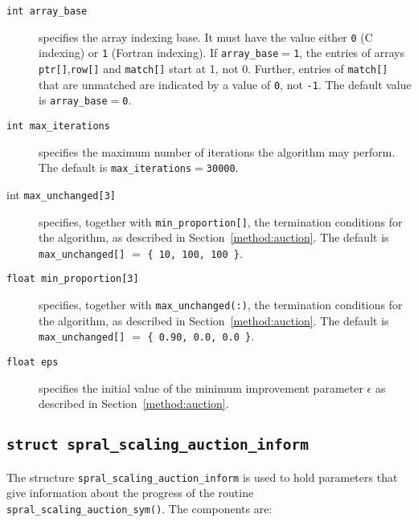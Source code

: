\begin{description}

\item[\texttt{int array\_base}] specifies the array indexing base. It must
   have the value either \texttt{0} (C indexing) or \texttt{1} (Fortran
   indexing). If \texttt{array\_base}$=$\texttt{1}, the entries of arrays
   \texttt{ptr[]},\texttt{row[]} and \texttt{match[]} start at 1, not 0.
   Further, entries of \texttt{match[]} that are unmatched are indicated by a
   value of \texttt{0}, not \texttt{-1}.
   The default value is \texttt{array\_base}$=$\texttt{0}.

\item[\texttt{int max\_iterations}] specifies the maximum number of iterations the algorithm may perform. The default is \texttt{max\_iterations}$=$\texttt{30000}.

\item[int \texttt{max\_unchanged[3]}] specifies, together with \texttt{min\_proportion[]}, the termination conditions for the algorithm, as described in Section~\ref{method:auction}. The default is \texttt{max\_unchanged[]} $=$ \texttt{\{ 10, 100, 100 \}}.

\item[\texttt{float min\_proportion[3]}] specifies, together with \texttt{max\_unchanged(:)}, the termination conditions for the algorithm, as described in Section~\ref{method:auction}. The default is \texttt{max\_unchanged[]} $=$ \texttt{\{ 0.90, 0.0, 0.0 \}}.

\item[\texttt{float eps}] specifies the initial value of the minimum improvement parameter $\epsilon$ as described in Section~\ref{method:auction}.

\end{description}

\subsection{\texttt{struct spral\_scaling\_auction\_inform}} \label{type:auction_inform}

The structure \texttt{spral\_scaling\_auction\_inform} is used to hold parameters that give information about the progress of the routine \texttt{spral\_scaling\_auction\_sym()}. The components are:


